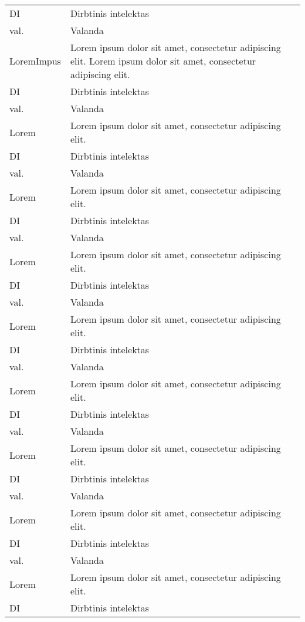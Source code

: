 \noindent
 \begin{longtable}[l]{ p{3cm} p{8cm} } %
        DI    & Dirbtinis intelektas\\ 
        val.  & Valanda\\ 
        LoremImpus & Lorem ipsum dolor sit amet, consectetur adipiscing elit. Lorem ipsum dolor sit amet, consectetur adipiscing elit.\\
        DI    & Dirbtinis intelektas\\ 
        val.  & Valanda\\ 
        Lorem & Lorem ipsum dolor sit amet, consectetur adipiscing elit.\\
        DI    & Dirbtinis intelektas\\ 
        val.  & Valanda\\ 
        Lorem & Lorem ipsum dolor sit amet, consectetur adipiscing elit.\\
        DI    & Dirbtinis intelektas\\ 
        val.  & Valanda\\ 
        Lorem & Lorem ipsum dolor sit amet, consectetur adipiscing elit.\\
        DI    & Dirbtinis intelektas\\ 
        val.  & Valanda\\ 
        Lorem & Lorem ipsum dolor sit amet, consectetur adipiscing elit.\\
        DI    & Dirbtinis intelektas\\ 
        val.  & Valanda\\ 
        Lorem & Lorem ipsum dolor sit amet, consectetur adipiscing elit.\\
        DI    & Dirbtinis intelektas\\ 
        val.  & Valanda\\ 
        Lorem & Lorem ipsum dolor sit amet, consectetur adipiscing elit.\\
        DI    & Dirbtinis intelektas\\ 
        val.  & Valanda\\ 
        Lorem & Lorem ipsum dolor sit amet, consectetur adipiscing elit.\\
        DI    & Dirbtinis intelektas\\ 
        val.  & Valanda\\ 
        Lorem & Lorem ipsum dolor sit amet, consectetur adipiscing elit.\\
        DI    & Dirbtinis intelektas\\ 

\end{longtable}
